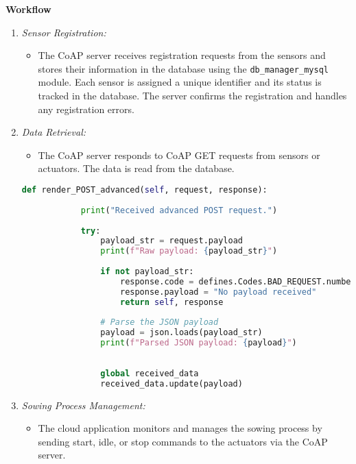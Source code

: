 \textbf{Workflow}
\begin{enumerate}
    \item \textit{Sensor Registration:}
          \begin{itemize}
              \item The CoAP server receives registration requests from the sensors and stores their information in the database using the \texttt{db\_manager\_mysql} module. Each sensor is assigned a unique identifier and its status is tracked in the database. The server confirms the registration and handles any registration errors.
          \end{itemize}

    \item \textit{Data Retrieval:}
          \begin{itemize}
              \item The CoAP server responds to CoAP GET requests from sensors or actuators. The data is read from the database.
          \end{itemize}

          \begin{lstlisting}[language=Python]
        def render_POST_advanced(self, request, response):
            
            print("Received advanced POST request.")
            
            try:
                payload_str = request.payload
                print(f"Raw payload: {payload_str}")
        
                if not payload_str:
                    response.code = defines.Codes.BAD_REQUEST.number
                    response.payload = "No payload received"
                    return self, response
        
                # Parse the JSON payload
                payload = json.loads(payload_str)
                print(f"Parsed JSON payload: {payload}")
        
                
                global received_data
                received_data.update(payload)
        \end{lstlisting}


    \item \textit{Sowing Process Management:}
          \begin{itemize}
              \item The cloud application monitors and manages the sowing process by sending start, idle, or stop commands to the actuators via the CoAP server.
          \end{itemize}


\end{enumerate}
